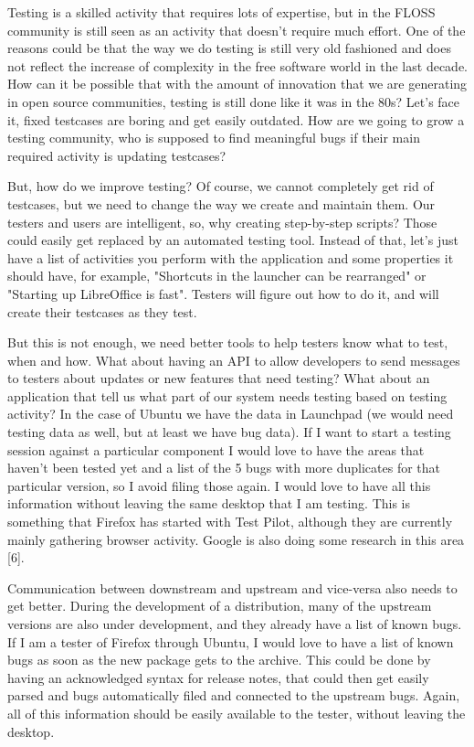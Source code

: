 Testing is a skilled activity that requires lots of expertise, but in the FLOSS community is still seen as an activity that doesn't require much effort. One of the reasons could be that the way we do testing is still very old fashioned and does not reflect the increase of complexity in the free software world in the last decade. How can it be possible that with the amount of innovation that we are generating in open source communities, testing is still done like it was in the 80s? Let's face it, fixed testcases are boring and get easily outdated. How are we going to grow a testing community, who is supposed to find meaningful bugs if their main required activity is updating testcases?

But, how do we improve testing? Of course, we cannot completely get rid of testcases, but we need to change the way we create and maintain them. Our testers and users are intelligent, so, why creating step-by-step scripts? Those could easily get replaced by an automated testing tool. Instead of that, let's just have a list of activities you perform with the application and some properties it should have, for example, "Shortcuts in the launcher can be rearranged" or "Starting up LibreOffice is fast". Testers will figure out how to do it, and will create their testcases as they test.

But this is not enough, we need better tools to help testers know what to test, when and how.  What about having an API to allow developers to send messages to testers about updates or new features that need testing? What about an application that tell us what part of our system needs testing based on testing activity? In the case of Ubuntu we have the data in Launchpad (we would need testing data as well, but at least we have bug data). If I want to start a testing session against a particular component I would love to have the areas that haven't been tested yet and a list of the 5 bugs with more duplicates for that particular version, so I avoid filing those again. I would love to have all this information without leaving the same desktop that I am testing. This is something that Firefox has started with Test Pilot, although they are currently mainly gathering browser activity. Google is also doing some research in this area [6].

Communication between downstream and upstream and vice-versa also needs to get better. During the development of a distribution, many of the upstream versions are also under development, and they already have a list of known bugs. If I am a tester of Firefox through Ubuntu, I would love to have a list of known bugs as soon as the new package gets to the archive. This could be done by having an acknowledged syntax for release notes, that could then get easily parsed and bugs automatically filed and connected to the upstream bugs. Again, all of this information should be easily available to the tester, without leaving the desktop.

